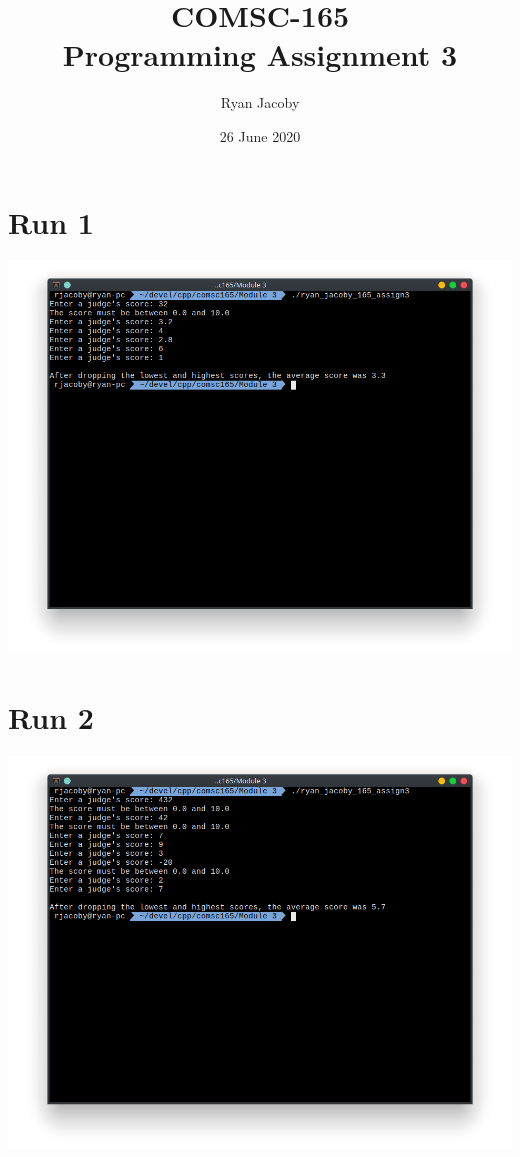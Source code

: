 \documentclass[letterpaper, 11pt]{article}
\title{COMSC-165 \\ Programming Assignment 3}
\author{Ryan Jacoby}
\date{26 June 2020}
\begin{document}
\maketitle

\section*{Run 1}
\includegraphics[scale=0.5]{Module 3/run1.png}

\section*{Run 2}
\includegraphics[scale=0.5]{Module 3/run2.png}
\end{document}
